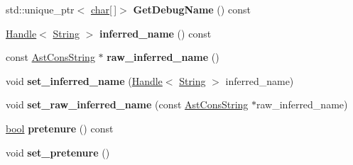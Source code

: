 \begin{DoxyCompactItemize}
\mbox{\label{classv8_1_1internal_1_1FunctionLiteral_af5f0627311bad32978cdc21c8d18465a}} 
std\+::unique\+\_\+ptr$<$ \mbox{\hyperlink{classchar}{char}}\mbox{[}$\,$\mbox{]}$>$ {\bfseries Get\+Debug\+Name} () const
\item 
\mbox{\label{classv8_1_1internal_1_1FunctionLiteral_ace872c6893e6284120f5d29daba614e0}} 
\mbox{\hyperlink{classv8_1_1internal_1_1Handle}{Handle}}$<$ \mbox{\hyperlink{classv8_1_1internal_1_1String}{String}} $>$ {\bfseries inferred\+\_\+name} () const
\item 
\mbox{\label{classv8_1_1internal_1_1FunctionLiteral_a00aaecb572643bb64582874c184f4a7a}} 
const \mbox{\hyperlink{classv8_1_1internal_1_1AstConsString}{Ast\+Cons\+String}} $\ast$ {\bfseries raw\+\_\+inferred\+\_\+name} ()
\item 
\mbox{\label{classv8_1_1internal_1_1FunctionLiteral_a80eb85688afb619fdebfcea87d02990f}} 
void {\bfseries set\+\_\+inferred\+\_\+name} (\mbox{\hyperlink{classv8_1_1internal_1_1Handle}{Handle}}$<$ \mbox{\hyperlink{classv8_1_1internal_1_1String}{String}} $>$ inferred\+\_\+name)
\item 
\mbox{\label{classv8_1_1internal_1_1FunctionLiteral_a034dc7ea6dd8518940f65d0333ea41c3}} 
void {\bfseries set\+\_\+raw\+\_\+inferred\+\_\+name} (const \mbox{\hyperlink{classv8_1_1internal_1_1AstConsString}{Ast\+Cons\+String}} $\ast$raw\+\_\+inferred\+\_\+name)
\item 
\mbox{\label{classv8_1_1internal_1_1FunctionLiteral_a0e5709c2e72d5e4ac60d88edc0a3ef43}} 
\mbox{\hyperlink{classbool}{bool}} {\bfseries pretenure} () const
\item 
\mbox{\label{classv8_1_1internal_1_1FunctionLiteral_ae0f1d8fa6eb53c0c35a554dfada96703}} 
void {\bfseries set\+\_\+pretenure} ()
\item 
\mbox{\label{classv8_1_1internal_1_1FunctionLiteral_a3698883fa4c653db06e6deb196640bd9}} 

\end{DoxyCompactItemize}
